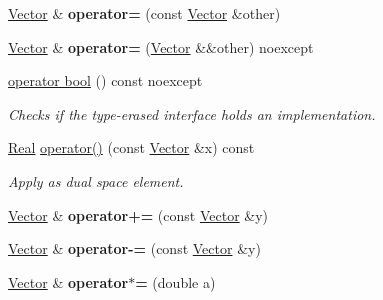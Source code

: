 \begin{DoxyCompactItemize}
\item 
\hypertarget{classSpacy_1_1Vector_a3184052aead1e3d2fc2b72f9b23607d2}{\hyperlink{classSpacy_1_1Vector}{\-Vector} \& {\bfseries operator=} (const \hyperlink{classSpacy_1_1Vector}{\-Vector} \&other)}\label{classSpacy_1_1Vector_a3184052aead1e3d2fc2b72f9b23607d2}

\item 
\hypertarget{classSpacy_1_1Vector_ac33a668c8906a994166727b241082309}{\hyperlink{classSpacy_1_1Vector}{\-Vector} \& {\bfseries operator=} (\hyperlink{classSpacy_1_1Vector}{\-Vector} \&\&other) noexcept}\label{classSpacy_1_1Vector_ac33a668c8906a994166727b241082309}

\item 
\hyperlink{classSpacy_1_1Vector_a3285df21a258aaf9d35dd3981ff0aa74}{operator bool} () const noexcept
\begin{DoxyCompactList}\small\item\em \-Checks if the type-\/erased interface holds an implementation. \end{DoxyCompactList}\item 
\hypertarget{classSpacy_1_1Vector_af6f1ec896b05538a931e72dbecdebbb1}{\hyperlink{classSpacy_1_1Real}{\-Real} \hyperlink{classSpacy_1_1Vector_af6f1ec896b05538a931e72dbecdebbb1}{operator()} (const \hyperlink{classSpacy_1_1Vector}{\-Vector} \&x) const }\label{classSpacy_1_1Vector_af6f1ec896b05538a931e72dbecdebbb1}

\begin{DoxyCompactList}\small\item\em \-Apply as dual space element. \end{DoxyCompactList}\item 
\hypertarget{classSpacy_1_1Vector_a6d5770a3bd58db532e79b16f2526c275}{\hyperlink{classSpacy_1_1Vector}{\-Vector} \& {\bfseries operator+=} (const \hyperlink{classSpacy_1_1Vector}{\-Vector} \&y)}\label{classSpacy_1_1Vector_a6d5770a3bd58db532e79b16f2526c275}

\item 
\hypertarget{classSpacy_1_1Vector_afbebc56400ed2e281815fee88b78b3f6}{\hyperlink{classSpacy_1_1Vector}{\-Vector} \& {\bfseries operator-\/=} (const \hyperlink{classSpacy_1_1Vector}{\-Vector} \&y)}\label{classSpacy_1_1Vector_afbebc56400ed2e281815fee88b78b3f6}

\item 
\hypertarget{classSpacy_1_1Vector_a06a3538f752f001b289c2f690357e1e7}{\hyperlink{classSpacy_1_1Vector}{\-Vector} \& {\bfseries operator$\ast$=} (double a)}\label{classSpacy_1_1Vector_a06a3538f752f001b289c2f690357e1e7}


\end{DoxyCompactItemize}
